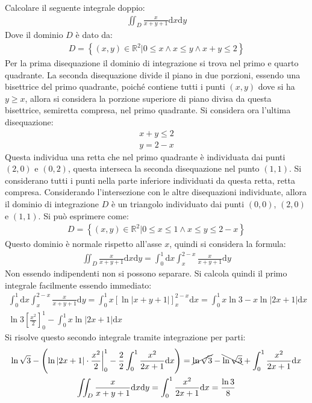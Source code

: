 \documentclass{article}
\newcommand{\df}{\mathrm{d}}
\numberwithin{equation}{subsection}
\begin{document}
Calcolare il seguente integrale doppio:
\begin{gather*}
    \iint_D\frac{x}{x+y+1}\df x\df y
\end{gather*}
Dove il dominio $D$ è dato da:
\begin{gather*}
    D=\left\{(x,y)\in\mathbb{R}^2\big|0\leq x\land x\leq y\land x+y\leq 2\right\}
\end{gather*}
Per la prima disequazione il dominio di integrazione si trova nel primo e quarto quadrante. La seconda disequazione divide il piano in due porzioni, essendo una bisettrice del primo quadrante, poiché contiene tutti i punti $(x,y)$ dove si ha $y\geq x$, allora si considera la porzione superiore di piano divisa da questa bisettrice, semiretta compresa, nel primo quadrante. 
Si considera ora l'ultima disequazione:
\begin{gather*}
    x+y\leq2\\
    y=2-x
\end{gather*}
Questa individua una retta che nel primo quadrante è individuata dai punti $(2,0)$ e $(0,2)$, questa interseca la seconda disequazione nel punto $(1,1)$. Si considerano tutti i punti nella parte inferiore individuati da questa retta, retta compresa. 
Considerando l'intersezione con le altre disequazioni individuate, allora il dominio di integrazione $D$ è un triangolo individuato dai punti $(0,0)$, $(2,0)$ e $(1,1)$. Si può esprimere come:
\begin{gather*}
    D=\left\{(x,y)\in\mathbb{R}^2\big|0\leq x\leq1\land x\leq y\leq2-x\right\}
\end{gather*}
Questo dominio è normale rispetto all'asse $x$, quindi si considera la formula:
\begin{gather*}
    \iint_D\frac{x}{x+y+1}\df x\df y=\int_0^1\df x\int_{x}^{2-x}\frac{x}{x+y+1}\df y
\end{gather*}
Non essendo indipendenti non si possono separare. Si calcola quindi il primo integrale facilmente essendo immediato:
\begin{gather*}
    \int_0^1\df x\int_{x}^{2-x}\frac{x}{x+y+1}\df y=
    \int_0^1x\left[\ln|x+y+1|\right]_x^{2-x}\df x=
    \int_0^1x\ln3 - x\ln|2x+1|\df x\\
    \ln3\left[\frac{x^2}{2}\right]_0^1-\int_0^1x\ln|2x+1|\df x    
\end{gather*}
Si risolve questo secondo integrale tramite integrazione per parti:
\begin{gather*}
    \ln\sqrt{3}-\left(\ln|2x+1|\cdot\frac{x^2}{2}\bigg|_0^1-\frac{2}{2}\int_0^1\frac{x^2}{2x+1}\df x\right)=
    \cancel{\ln\sqrt{3}}-\bcancel{\ln\sqrt{3}}+\int_0^1\frac{x^2}{2x+1}\df x\\
    \iint_D\frac{x}{x+y+1}\df x\df y=\int_0^1\frac{x^2}{2x+1}\df x=\frac{\ln3}{8}
\end{gather*}
\end{document}
